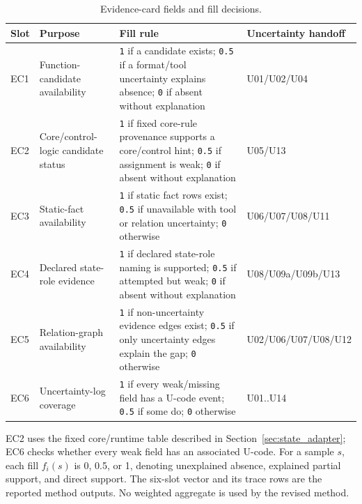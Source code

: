 \documentclass[manuscript,screen,review]{acmart}
\begin{document}
\begin{table}[t]
\centering
\small
\caption{Evidence-card fields and fill decisions.}
\label{tab:s5_1}
\begin{tabularx}{\textwidth}{>{\raggedright\arraybackslash}p{}>{\raggedright\arraybackslash}p{}>{\raggedright\arraybackslash}X>{\raggedright\arraybackslash}p{}}
\toprule
Slot & Purpose & Fill rule & Uncertainty handoff \\
\midrule
EC1 & Function-candidate availability & \texttt{1} if a candidate exists; \texttt{0.5} if a format/tool uncertainty explains absence; \texttt{0} if absent without explanation & U01/U02/U04 \\
EC2 & Core/control-logic candidate status & \texttt{1} if fixed core-rule provenance supports a core/control hint; \texttt{0.5} if assignment is weak; \texttt{0} if absent without explanation & U05/U13 \\
EC3 & Static-fact availability & \texttt{1} if static fact rows exist; \texttt{0.5} if unavailable with tool or relation uncertainty; \texttt{0} otherwise & U06/U07/U08/U11 \\
EC4 & Declared state-role evidence & \texttt{1} if declared state-role naming is supported; \texttt{0.5} if attempted but weak; \texttt{0} if absent without explanation & U08/U09a/U09b/U13 \\
EC5 & Relation-graph availability & \texttt{1} if non-uncertainty evidence edges exist; \texttt{0.5} if only uncertainty edges explain the gap; \texttt{0} otherwise & U02/U06/U07/U08/U12 \\
EC6 & Uncertainty-log coverage & \texttt{1} if every weak/missing field has a U-code event; \texttt{0.5} if some do; \texttt{0} otherwise & U01..U14 \\
\bottomrule
\end{tabularx}
\end{table}

EC2 uses the fixed core/runtime table described in Section~\ref{sec:state_adapter}; EC6 checks whether every weak field has an associated U-code. For a sample $s$, each fill $f_i(s)$ is 0, 0.5, or 1, denoting unexplained absence, explained partial support, and direct support. The six-slot vector and its trace rows are the reported method outputs. No weighted aggregate is used by the revised method.
\end{document}
